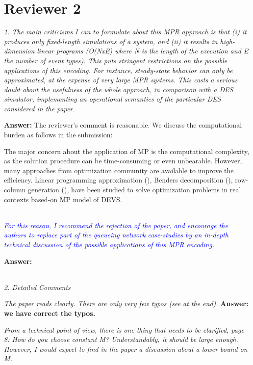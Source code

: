 \documentclass[suppldata]{interact}
\begin{document}
\section{Reviewer 2}

\textit{1. The main criticisms I can to formulate about this MPR approach is that
(i) it produces only fixed-length simulations of a system, and (ii) it
results in high-dimension linear programs (O(NxE) where N is the
length of the execution and E the number of event types). This puts
stringent restrictions on the possible applications of this
encoding. For instance, steady-state behavior can only be
approximated, at the expense of very large MPR systems. This casts a
serious doubt about the usefulness of the whole approach, in
comparison with a DES simulator, implementing an operational
semantics of the particular DES considered in the paper.}

\noindent
\textbf{Answer:} The reviewer's comment is reasonable. We %
discuss the computational burden as follows in the submission:

The major concern about the application of MP is the computational complexity, %
as the solution procedure can be time-consuming or even unbearable. However, many approaches from optimization community are available to improve the efficiency. Linear programming approximation (\cite{alfieri2012mathematical}), Benders decomposition (\cite{weiss2015buffer}), row-column generation (\cite{alfieri2020time}), have been studied to solve optimization problems in %
real contexts based-on MP model of DEVS.

~\\

\textit{\textcolor{blue}{For this reason, I recommend the rejection of the paper, and encourage the authors to replace part of the queueing network case-studies by an in-depth technical discussion of the possible applications of this MPR encoding.}}

\noindent
\textbf{Answer:}

~\\

\textit{2. Detailed Comments}


\textit{The paper reads clearly. There are only very few typos (see at the end).}
\textbf{Answer: we have correct the typos.}



\textit{From a technical point of view, there is one thing that needs to be clarified, page 8: How do you choose constant M? Understandably, it should be large enough. However, I would expect to find in the paper a discussion about a lower bound on M.}
\end{document}
